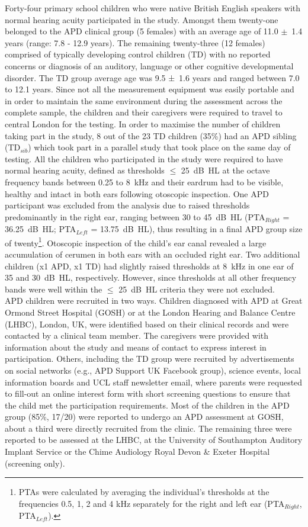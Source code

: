 \documentclass[a4paper, twoside]{templates/ociamthesis}
\begin{document}
Forty-four primary school children who were native British English speakers with normal hearing acuity participated in the study. Amongst them twenty-one belonged to the APD clinical group (5 females) with an average age of 11.0 \(\pm\)~1.4 years (range: 7.8 - 12.9 years). The remaining twenty-three (12 females) comprised of typically developing control children (TD) with no reported concerns or diagnosis of an auditory, language or other cognitive developmental disorder. The TD group average age was 9.5 ±~1.6 years and ranged between 7.0 to 12.1 years. Since not all the measurement equipment was easily portable and in order to maintain the same environment during the assessment across the complete sample, the children and their caregivers were required to travel to central London for the testing. In order to maximise the number of children taking part in the study, 8 out of the 23 TD children (35\%) had an APD sibling (TD\(_{sib}\)) which took part in a parallel study that took place on the same day of testing. All the children who participated in the study were required to have normal hearing acuity, defined as thresholds \(\leq\) 25~dB~HL at the octave frequency bands between 0.25 to 8~kHz and their eardrum had to be visible, healthy and intact in both ears following otoscopic inspection. One APD participant was excluded from the analysis due to raised thresholds predominantly in the right ear, ranging between 30 to 45~dB~HL (PTA\(_{Right}\) = 36.25~dB~HL; PTA\(_{Left}\) = 13.75~dB~HL), thus resulting in a final APD group size of twenty\footnote{PTAs were calculated by averaging the individual's thresholds at the frequencies 0.5, 1, 2 and 4 kHz separately for the right and left ear (PTA\(_{Right}\), PTA\(_{Left}\)).}. Otoscopic inspection of the child's ear canal revealed a large accumulation of cerumen in both ears with an occluded right ear. Two additional children (x1 APD, x1 TD) had slightly raised thresholds at 8~kHz in one ear of 35 and 30~dB~HL, respectively. However, since thresholds at all other frequency bands were well within the \(\leq\) 25~dB~HL criteria they were not excluded.\\

APD children were recruited in two ways. Children diagnosed with APD at Great Ormond Street Hospital (GOSH) or at the London Hearing and Balance Centre (LHBC), London, UK, were identified based on their clinical records and were contacted by a clinical team member. The caregivers were provided with information about the study and means of contact to express interest in participation. Others, including the TD group were recruited by advertisements on social networks (e.g., APD Support UK Facebook group), science events, local information boards and UCL staff newsletter email, where parents were requested to fill-out an online interest form with short screening questions to ensure that the child met the participation requirements. Most of the children in the APD group (85\%, 17/20) were reported to undergo an APD assessment at GOSH, about a third were directly recruited from the clinic. The remaining three were reported to be assessed at the LHBC, at the University of Southampton Auditory Implant Service or the Chime Audiology Royal Devon \& Exeter Hospital (screening only).\\
\end{document}
